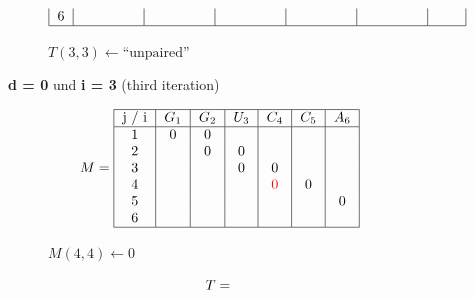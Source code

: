\begin{figure}[H]
\begin{subfigure}[t]{0.65\textwidth}
\[\begin{tabular}{|c|c|c|c|c|c|c|}
                                    6 & \textcolor{white}{unpaired} & \textcolor{white}{unpaired} & \textcolor{white}{unpaired}
                                    & \textcolor{white}{unpaired}
                                    & \textcolor{white}{unpaired}
                                    & \textcolor{white}{init}
                                    \\ \hline
                        \end{tabular}
        \]
        \caption{$T(3,3) \gets \text{``unpaired''}$ }
    \end{subfigure}
    \caption{\textbf{d = 0} und \textbf{i = 3} (third iteration)}\label{fig:figure22}

\end{figure}


\begin{figure}[H]
    \centering
    \begin{subfigure}[t]{0.25\textwidth}
        \scriptsize \[
                        M =  \begin{tabular}{|c|c|c|c|c|c|c|}
                                 \hline
                                 j / i & $G_1$ & $G_2$ & $U_3$ & $C_4$              & $C_5$ & $A_6$ \\ \hline
                                 1     & 0     & 0     &       &                    &       &       \\
                                 2     &       & 0     & 0     &                    &       &       \\
                                 3     &       &       & 0     & 0                  &       &       \\
                                 4     &       &       &       & \textcolor{red}{0} & 0     &       \\
                                 5     &       &       &       &                    &       & 0     \\
                                 6     &       &       &       &                    &       &       \\ \hline
                        \end{tabular}
        \]
        \caption{$M(4,4) \gets 0$}
    \end{subfigure}
    \hfill
    \begin{subfigure}[t]{0.65\textwidth}
        \scriptsize \[
                        T =     \begin{tabular}{|c|c|c|c|c|c|c|}
                                    \hline

\end{tabular}\]
\end{subfigure}
\end{figure}
